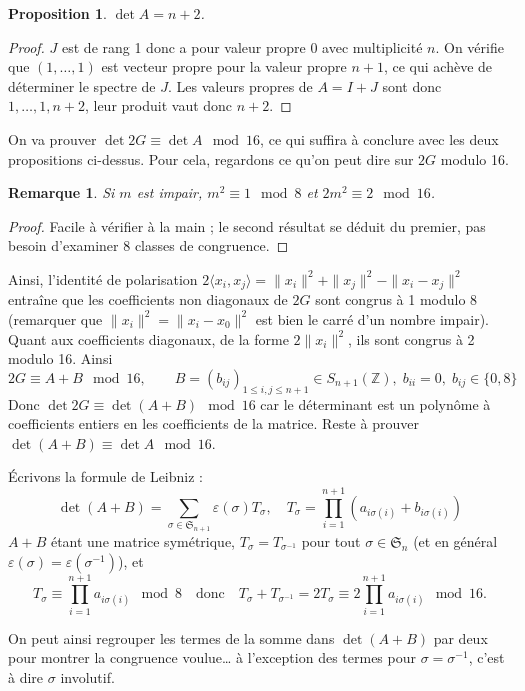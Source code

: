 \documentclass[a4paper, 11pt]{article}
\def\Z{\mathbb{Z}}
\def\Sigmap{\mathfrak{S}}
\newtheorem*{proposition}{Proposition}
\newtheorem*{remark}{Remarque}
\begin{document}
\begin{proposition}
  $\det A = n+2$.
\end{proposition}
\begin{proof}
  $J$ est de rang 1 donc a pour valeur propre 0 avec multiplicité $n$. On
  vérifie que $(1,\ldots,1)$ est vecteur propre pour la valeur propre $n+1$, ce
  qui achève de déterminer le spectre de $J$. Les valeurs propres de $A = I+J$
  sont donc $1, \ldots, 1, n+2$, leur produit vaut donc $n+2$.
\end{proof}

On va prouver $\det 2G \equiv \det A \mod 16$, ce qui suffira à conclure avec
les deux propositions ci-dessus. Pour cela, regardons ce qu'on peut dire sur
$2G$ modulo 16.

\begin{remark}
  Si $m$ est impair, $m^2 \equiv 1 \mod 8$ et $2m^2 \equiv 2 \mod 16$.
\end{remark}
\begin{proof}
  Facile à vérifier à la main ; le second résultat se déduit du premier, pas
  besoin d'examiner 8 classes de congruence.
\end{proof}

Ainsi, l'identité de polarisation $2 \langle x_i, x_j \rangle = \|x_i\|^2 +
\|x_j\|^2 - \|x_i - x_j\|^2$ entraîne que les coefficients non diagonaux de $2G$
sont congrus à 1 modulo 8 (remarquer que $\|x_i\|^2 = \|x_i - x_0\|^2$ est bien
le carré d'un nombre impair). Quant aux coefficients diagonaux, de la forme
$2\|x_i\|^2$, ils sont congrus à 2 modulo 16. Ainsi
\[ 2G \equiv A + B \mod 16, \qquad B = (b_{ij})_{1 \leq i,j \leq n+1} \in
  S_{n+1}(\Z),\; b_{ii} = 0,\; b_{ij} \in \{0,8\} \]
Donc $\det 2G \equiv \det(A+B) \mod 16$ car le déterminant est un polynôme à
coefficients entiers en les coefficients de la matrice. Reste à prouver
$\det(A+B) \equiv \det A \mod 16$.

Écrivons la formule de Leibniz :
\[ \det(A+B) = \sum_{\sigma \in \Sigmap_{n+1}} \varepsilon(\sigma) T_\sigma,
  \quad T_\sigma = \prod_{i=1}^{n+1} (a_{i \sigma(i)} + b_{i \sigma(i)}) \]
$A+B$ étant une matrice symétrique, $T_\sigma = T_{\sigma^{-1}}$ pour tout
$\sigma \in \Sigmap_n$ (et en général $\varepsilon(\sigma) =
\varepsilon(\sigma^{-1})$), et
\[ T_\sigma \equiv \prod_{i=1}^{n+1} a_{i \sigma(i)} \mod 8 \quad \text{donc}
  \quad T_\sigma + T_{\sigma^{-1}} = 2 T_\sigma \equiv 2 \prod_{i=1}^{n+1} a_{i
    \sigma(i)} \mod 16. \]

On peut ainsi regrouper les termes de la somme dans $\det(A+B)$ par deux pour
montrer la congruence voulue… à l'exception des termes pour $\sigma =
\sigma^{-1}$, c'est à dire $\sigma$ involutif.
\end{document}
